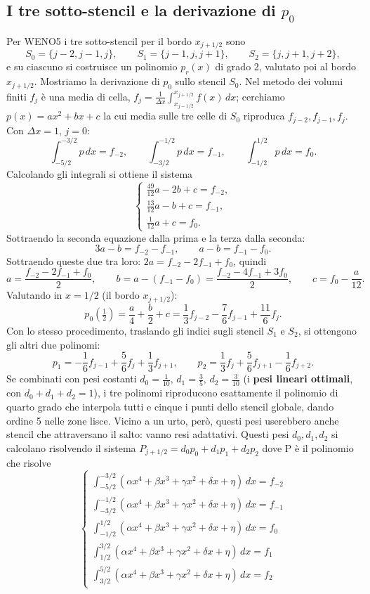 \documentclass[12pt]{article}
\begin{document}
\newpage

\subsection{I tre sotto-stencil e la derivazione di $p_0$}

Per WENO5 i tre sotto-stencil per il bordo $x_{j+1/2}$ sono
\[
S_0=\{j-2,j-1,j\}, \qquad S_1=\{j-1,j,j+1\}, \qquad S_2=\{j,j+1,j+2\},
\]
e su ciascuno si costruisce un polinomio $p_r(x)$ di grado 2, valutato poi al bordo $x_{j+1/2}$. Mostriamo la derivazione di $p_0$ sullo stencil $S_0$. Nel metodo dei volumi finiti $f_j$ è una media di cella, $f_j=\frac{1}{\Delta x}\int_{x_{j-1/2}}^{x_{j+1/2}} f(x)\,dx$; cerchiamo $p(x)=ax^2+bx+c$ la cui media sulle tre celle di $S_0$ riproduca $f_{j-2},f_{j-1},f_j$. Con $\Delta x=1$, $j=0$:
\[
\int_{-5/2}^{-3/2}p\,dx=f_{-2}, \qquad \int_{-3/2}^{-1/2}p\,dx=f_{-1}, \qquad \int_{-1/2}^{1/2}p\,dx=f_0.
\]
Calcolando gli integrali si ottiene il sistema
\[
\begin{cases}
\frac{49}{12}a-2b+c=f_{-2}, \\
\frac{13}{12}a-b+c=f_{-1}, \\
\frac{1}{12}a+c=f_0.
\end{cases}
\]
Sottraendo la seconda equazione dalla prima e la terza dalla seconda:
\[
3a-b=f_{-2}-f_{-1}, \qquad a-b=f_{-1}-f_0.
\]
Sottraendo queste due tra loro: $2a=f_{-2}-2f_{-1}+f_0$, quindi
\[
a=\frac{f_{-2}-2f_{-1}+f_0}{2}, \qquad b=a-(f_{-1}-f_0)=\frac{f_{-2}-4f_{-1}+3f_0}{2}, \qquad c=f_0-\frac{a}{12}.
\]
Valutando in $x=1/2$ (il bordo $x_{j+1/2}$):
\[
p_0\left(\tfrac12\right) = \frac{a}{4}+\frac{b}{2}+c = \frac13 f_{j-2}-\frac76 f_{j-1}+\frac{11}{6}f_j.
\]
Con lo stesso procedimento, traslando gli indici sugli stencil $S_1$ e $S_2$, si ottengono gli altri due polinomi:
\[
p_1 = -\frac16 f_{j-1}+\frac56 f_j+\frac13 f_{j+1}, \qquad
p_2 = \frac13 f_j+\frac56 f_{j+1}-\frac16 f_{j+2}.
\]
Se combinati con pesi costanti $d_0=\frac{1}{10},\,d_1=\frac35,\,d_2=\frac{3}{10}$ (i \textbf{pesi lineari ottimali}, con $d_0+d_1+d_2=1$), i tre polinomi riproducono esattamente il polinomio di quarto grado che interpola tutti e cinque i punti dello stencil globale, dando ordine 5 nelle zone lisce. Vicino a un urto, però, questi pesi userebbero anche stencil che attraversano il salto: vanno resi adattativi.
Questi pesi $d_0,d_1,d_2$ si calcolano risolvendo il sistema $P_{j+1/2}=d_0p_0+d_1p_1+d_2p_2$ dove P è il polinomio che risolve \[
\begin{cases}
\int_{-5/2}^{-3/2} (\alpha x^4 + \beta x^3 + \gamma x^2 + \delta x + \eta)\,dx = f_{-2} \\
\int_{-3/2}^{-1/2} (\alpha x^4 + \beta x^3 + \gamma x^2 + \delta x + \eta)\,dx = f_{-1} \\
\int_{-1/2}^{1/2} (\alpha x^4 + \beta x^3 + \gamma x^2 + \delta x + \eta)\,dx = f_0 \\
\int_{1/2}^{3/2} (\alpha x^4 + \beta x^3 + \gamma x^2 + \delta x + \eta)\,dx = f_1 \\
\int_{3/2}^{5/2} (\alpha x^4 + \beta x^3 + \gamma x^2 + \delta x + \eta)\,dx = f_2
\end{cases}
\]
\end{document}
